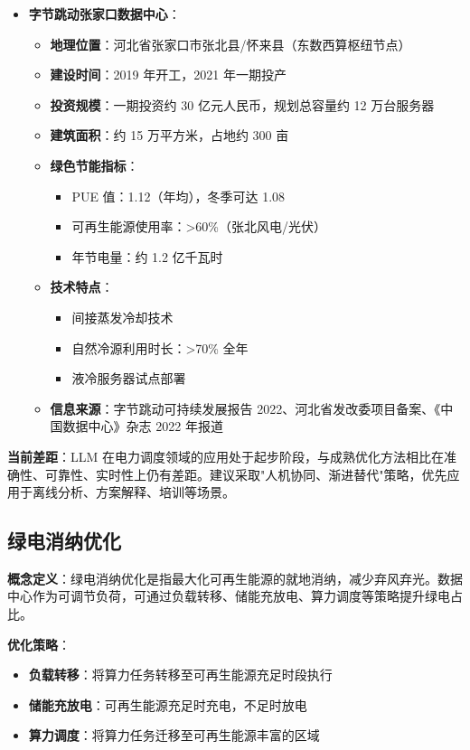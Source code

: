\documentclass[12pt,a4paper]{article}
\begin{document}
\begin{itemize}
    \item \textbf{字节跳动张家口数据中心}：
    \begin{itemize}
        \item \textbf{地理位置}：河北省张家口市张北县/怀来县（东数西算枢纽节点）
        \item \textbf{建设时间}：2019 年开工，2021 年一期投产
        \item \textbf{投资规模}：一期投资约 30 亿元人民币，规划总容量约 12 万台服务器
        \item \textbf{建筑面积}：约 15 万平方米，占地约 300 亩
        \item \textbf{绿色节能指标}：
        \begin{itemize}
            \item PUE 值：1.12（年均），冬季可达 1.08
            \item 可再生能源使用率：>60\%（张北风电/光伏）
            \item 年节电量：约 1.2 亿千瓦时
        \end{itemize}
        \item \textbf{技术特点}：
        \begin{itemize}
            \item 间接蒸发冷却技术
            \item 自然冷源利用时长：>70\% 全年
            \item 液冷服务器试点部署
        \end{itemize}
        \item \textbf{信息来源}：字节跳动可持续发展报告 2022、河北省发改委项目备案、《中国数据中心》杂志 2022 年报道\cite{bytedance2022sustainability}
    \end{itemize}
\end{itemize}

\textbf{当前差距}：LLM 在电力调度领域的应用处于起步阶段，与成熟优化方法相比在准确性、可靠性、实时性上仍有差距。建议采取"人机协同、渐进替代"策略，优先应用于离线分析、方案解释、培训等场景。

\subsection{绿电消纳优化}

\textbf{概念定义}：绿电消纳优化是指最大化可再生能源的就地消纳，减少弃风弃光。数据中心作为可调节负荷，可通过负载转移、储能充放电、算力调度等策略提升绿电占比\cite{jin2023carbon}。

\textbf{优化策略}：
\begin{itemize}
    \item \textbf{负载转移}：将算力任务转移至可再生能源充足时段执行
    \item \textbf{储能充放电}：可再生能源充足时充电，不足时放电
    \item \textbf{算力调度}：将算力任务迁移至可再生能源丰富的区域
\end{itemize}
\end{document}
